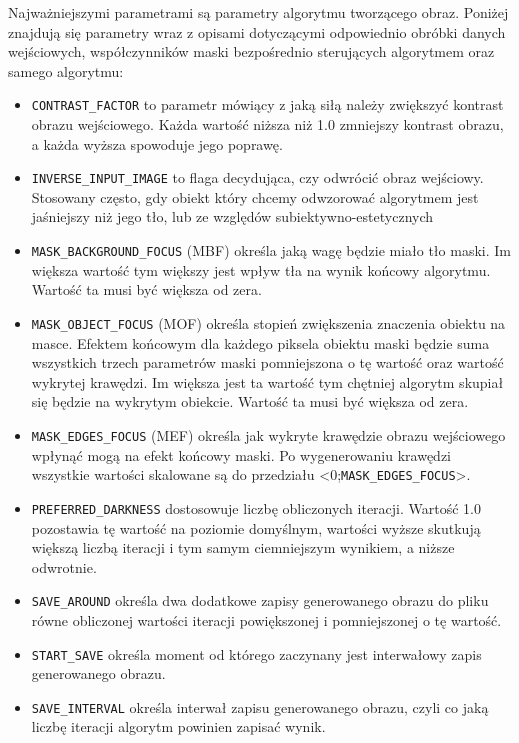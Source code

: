     Najważniejszymi parametrami są parametry algorytmu tworzącego obraz. Poniżej znajdują się parametry wraz z opisami dotyczącymi odpowiednio obróbki danych wejściowych, współczynników maski bezpośrednio sterujących algorytmem oraz samego algorytmu:
    \begin{itemize}
        \item \texttt{CONTRAST_FACTOR} to parametr mówiący z jaką siłą należy zwiększyć kontrast obrazu wejściowego. Każda wartość niższa niż 1.0 zmniejszy kontrast obrazu, a każda wyższa spowoduje jego poprawę.
        \item \texttt{INVERSE_INPUT_IMAGE} to flaga decydująca, czy odwrócić obraz wejściowy. Stosowany często, gdy obiekt który chcemy odwzorować algorytmem jest jaśniejszy niż jego tło, lub ze względów subiektywno-estetycznych 
        \item \texttt{MASK_BACKGROUND_FOCUS} (MBF) określa jaką wagę będzie miało tło maski. Im większa wartość tym większy jest wpływ tła na wynik końcowy algorytmu. Wartość ta musi być większa od zera.
        \item \texttt{MASK_OBJECT_FOCUS} (MOF) określa stopień zwiększenia znaczenia obiektu na masce. Efektem końcowym dla każdego piksela obiektu maski będzie suma wszystkich trzech parametrów maski pomniejszona o tę wartość oraz wartość wykrytej krawędzi. Im większa jest ta wartość tym chętniej algorytm skupiał się będzie na wykrytym obiekcie. Wartość ta musi być większa od zera.
        \item \texttt{MASK_EDGES_FOCUS} (MEF) określa jak wykryte krawędzie obrazu wejściowego wpłynąć mogą na efekt końcowy maski. Po wygenerowaniu krawędzi wszystkie wartości skalowane są do przedziału <0;\texttt{MASK_EDGES_FOCUS}>.
        \item \texttt{PREFERRED_DARKNESS} dostosowuje liczbę obliczonych iteracji. Wartość 1.0 pozostawia tę wartość na poziomie domyślnym, wartości wyższe skutkują większą liczbą iteracji i tym samym ciemniejszym wynikiem, a niższe odwrotnie.
        \item \texttt{SAVE_AROUND} określa dwa dodatkowe zapisy generowanego obrazu do pliku równe obliczonej wartości iteracji powiększonej i pomniejszonej o tę wartość.
        \item \texttt{START_SAVE} określa moment od którego zaczynany jest interwałowy zapis generowanego obrazu.
        \item \texttt{SAVE_INTERVAL} określa interwał zapisu generowanego obrazu, czyli co jaką liczbę iteracji algorytm powinien zapisać wynik.

\end{itemize}
